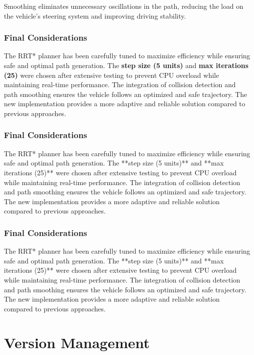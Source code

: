 \documentclass[a4paper,11pt]{report}
\begin{document}
Smoothing eliminates unnecessary oscillations in the path, reducing the load on the vehicle's steering system and improving driving stability.

\subsection{Final Considerations}
The RRT* planner has been carefully tuned to maximize efficiency while ensuring safe and optimal path generation. The \textbf{step size (5 units)} and \textbf{max iterations (25)} were chosen after extensive testing to prevent CPU overload while maintaining real-time performance. The integration of collision detection and path smoothing ensures the vehicle follows an optimized and safe trajectory. The new implementation provides a more adaptive and reliable solution compared to previous approaches.

\subsection{Final Considerations}
The RRT* planner has been carefully tuned to maximize efficiency while ensuring safe and optimal path generation. The **step size (5 units)** and **max iterations (25)** were chosen after extensive testing to prevent CPU overload while maintaining real-time performance. The integration of collision detection and path smoothing ensures the vehicle follows an optimized and safe trajectory. The new implementation provides a more adaptive and reliable solution compared to previous approaches.


\subsection{Final Considerations}
The RRT* planner has been carefully tuned to maximize efficiency while ensuring safe and optimal path generation. The **step size (5 units)** and **max iterations (25)** were chosen after extensive testing to prevent CPU overload while maintaining real-time performance. The integration of collision detection and path smoothing ensures the vehicle follows an optimized and safe trajectory. The new implementation provides a more adaptive and reliable solution compared to previous approaches.




\newpage


\chapter {Version Management}
\end{document}
